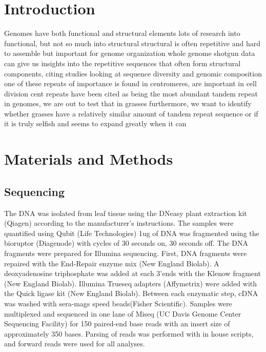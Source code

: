\documentclass[10pt,letterpaper]{article}
\begin{document}
\linenumbers

\section*{Introduction}
Genomes have both functional and structural elements
lots of research into functional, but not so much into structural
structural is often repetitive and hard to assemble but important for genome organization
whole genome shotgun data can give us insights into the repetitive sequences that often form structural components, citing studies looking at sequence diversity and genomic composition
one of these repeats of importance is found in centromeres, are important in cell division
cent repeats have been cited as being the most abundant tandem repeat in genomes, we are out to test that in grasses
furthermore, we want to identify whether grasses have a relatively similar amount of tandem repeat sequence or if it is truly selfish and seems to expand greatly when it can


\section*{Materials and Methods}

\subsection*{Sequencing}
The DNA was isolated from leaf tissue using the DNeasy plant extraction kit (Qiagen) according to the manufacturer’s instructions. 
The samples were quantified using Qubit (Life Technologies) 1ug of DNA was fragmented using the bioruptor (Diagenode) with cycles of 30 seconds on, 30 seconds off. 
The DNA fragments were prepared for Illumina sequencing. 
First, DNA fragments were repaired with the End-Repair enzyme mix (New England Biolab). 
A deoxyadenosine triphosphate was added at each 3'ends with the Klenow fragment (New England Biolab). 
Illumina Trueseq adapters (Affymetrix) were added with the Quick ligase kit (New England Biolab). 
Between each enzymatic step, cDNA was washed with sera-mags speed beads(Fisher Scientific).
Samples were multiplexed and sequenced in one lane of Miseq (UC Davis Genome Center Sequencing Facility) for 150 paired-end base reads with an insert size of approximately 350 bases.
Parsing of reads was performed with in house scripts, and forward reads were used for all analyses.
\end{document}
